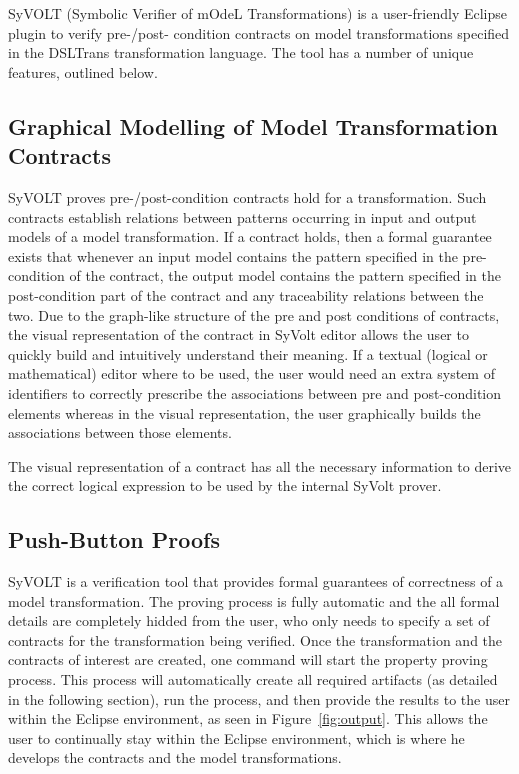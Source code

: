 SyVOLT (Symbolic Verifier of mOdeL Transformations) is a user-friendly
Eclipse plugin to verify pre-/post- condition contracts on model transformations
specified in the DSLTrans transformation language. The tool has a number of
unique features, outlined below.

\subsection{Graphical Modelling of Model Transformation Contracts}

SyVOLT proves pre-/post-condition contracts hold for a transformation. Such
contracts establish relations between patterns occurring in input and output
models of a model transformation. If a contract holds, then a formal guarantee
exists that whenever an input model contains the pattern specified in the
pre-condition of the contract, the output model contains the pattern specified
in the post-condition part of the contract and any traceability relations
between the two. Due to the graph-like structure of the pre and post conditions
of contracts, the visual representation of the contract in SyVolt editor allows
the user to quickly build and intuitively understand their meaning.
If a textual (logical or mathematical) editor where to be used, the user would
need an extra system of identifiers to correctly prescribe the associations between pre and post-condition elements whereas in the visual representation, the user graphically builds the associations between those elements.

The visual representation of a contract has all the necessary information to derive the correct 
logical expression to be used by the internal SyVolt prover.

\subsection{Push-Button Proofs}
\label{sec:push_button_proofs}
SyVOLT is a verification tool that provides formal guarantees of correctness of
a model transformation. The proving process is fully automatic and the all
formal details are completely hidded from the user, who only needs to specify a
set of contracts for the transformation being verified. Once the transformation and the
contracts of interest are created, one command will start the property proving
process. This process will automatically create all required artifacts (as
detailed in the following section), run the process, and then provide the
results to the user within the Eclipse environment, as seen in
Figure~\ref{fig:output}. This allows the user to continually stay within the
Eclipse environment, which is where he develops the contracts and the model
transformations.

